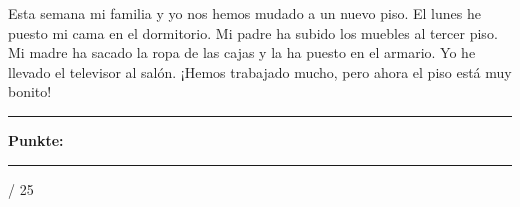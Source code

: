\documentclass[10pt, a4paper]{article}
\newcommand{\sanstext}[1]{{\fontfamily{phv}\selectfont #1}}
\newcommand{\maxpunkte}{25}
\newcommand{\luecke}[1]{\rule{#1}{0.4pt}}
\begin{document}
\vspace{2pt}

{\small\textcolor{loesung}{
Esta semana mi familia y yo nos hemos mudado a un nuevo piso.
El lunes he puesto mi cama en el dormitorio.
Mi padre ha subido los muebles al tercer piso.
Mi madre ha sacado la ropa de las cajas y la ha puesto en el armario.
Yo he llevado el televisor al salón.
¡Hemos trabajado mucho, pero ahora el piso está muy bonito!
}}


\vfill

\noindent\rule{\textwidth}{0.5pt}

\vspace{4pt}

\hfill\sanstext{\textbf{Punkte:}} \luecke{1.2cm} / \maxpunkte
\end{document}
